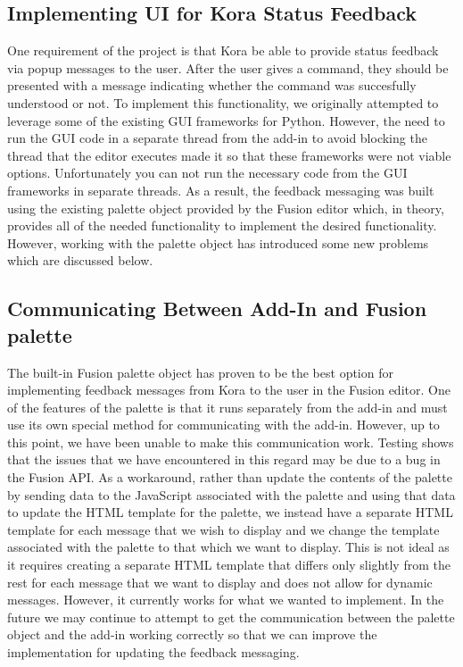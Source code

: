 \documentclass[onecolumn, draftclsnofoot,10pt, compsoc]{IEEEtran}
\begin{document}
	\subsection{Implementing UI for Kora Status Feedback}
		One requirement of the project is that Kora be able to provide status feedback via popup messages to the user.
		After the user gives a command, they should be presented with a message indicating whether the command was succesfully understood or not.
		To implement this functionality, we originally attempted to leverage some of the existing GUI frameworks for Python. 
		However, the need to run the GUI code in a separate thread from the add-in to avoid blocking the thread that the editor executes made it so that these frameworks were not viable options.
		Unfortunately you can not run the necessary code from the GUI frameworks in separate threads. 
		As a result, the feedback messaging was built using the existing palette object provided by the Fusion editor which, in theory, provides all of the needed functionality to implement the desired functionality.
		However, working with the palette object has introduced some new problems which are discussed below.

	\subsection{Communicating Between Add-In and Fusion palette}
		The built-in Fusion palette object has proven to be the best option for implementing feedback messages from Kora to the user in the Fusion editor.
		One of the features of the palette is that it runs separately from the add-in and must use its own special method for communicating with the add-in.
		However, up to this point, we have been unable to make this communication work.
		Testing shows that the issues that we have encountered in this regard may be due to a bug in the Fusion API.
		As a workaround, rather than update the contents of the palette by sending data to the JavaScript associated with the palette and using that data to update the HTML template for the palette,
		we instead have a separate HTML template for each message that we wish to display and we change the template associated with the palette to that which we want to display.
		This is not ideal as it requires creating a separate HTML template that differs only slightly from the rest for each message that we want to display and does not allow for dynamic messages.
		However, it currently works for what we wanted to implement.
		In the future we may continue to attempt to get the communication between the palette object and the add-in working correctly so that we can improve the implementation for updating the feedback messaging.
 
\end{document}
